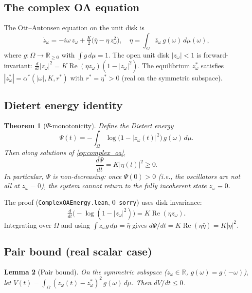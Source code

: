 \documentclass[12pt]{article}
\newtheorem{theorem}{Theorem}[section]
\newtheorem{lemma}[theorem]{Lemma}
\theoremstyle{definition}
\begin{document}
\subsection{The complex OA equation}

The Ott--Antonsen equation on the unit disk is
\begin{equation}\label{eq:complex_oa}
\dot z_\omega = -i\omega\, z_\omega + \tfrac{K}{2}\bigl(\bar\eta - \eta\, z_\omega^2\bigr),
\quad \eta = \int_\Omega \bar z_\omega\, g(\omega)\,d\mu(\omega),
\end{equation}
where $g : \Omega \to \mathbb{R}_{\ge 0}$ with $\int g\,d\mu = 1$.
The open unit disk $|z_\omega| < 1$ is forward-invariant:
$\frac{d}{dt}|z_\omega|^2 = K\operatorname{Re}(\eta z_\omega)(1 - |z_\omega|^2)$.
The equilibrium $z^*_\omega$ satisfies $|z^*_\omega| = \alpha^*(|\omega|, K, r^*)$
with $r^* = \eta^* > 0$ (real on the symmetric subspace).

\subsection{Dietert energy identity}

\begin{theorem}[$\Psi$-monotonicity]\label{thm:psi_mono}
Define the Dietert energy
\[
\Psi(t) = -\int_\Omega \log\bigl(1 - |z_\omega(t)|^2\bigr)\,g(\omega)\,d\mu.
\]
Then along solutions of \eqref{eq:complex_oa},
\begin{equation}\label{eq:psi_deriv}
\frac{d\Psi}{dt} = K|\eta(t)|^2 \ge 0.
\end{equation}
In particular, $\Psi$ is non-decreasing: once $\Psi(0) > 0$
(i.e., the oscillators are not all at $z_\omega = 0$), the system
cannot return to the fully incoherent state $z_\omega \equiv 0$.
\end{theorem}

The proof (\texttt{ComplexOAEnergy.lean}, 0~\texttt{sorry}) uses disk
invariance:
\[
\tfrac{d}{dt}\bigl(-\log(1-|z_\omega|^2)\bigr) = K\operatorname{Re}(\eta z_\omega).
\]
Integrating over $\Omega$ and using $\int z_\omega g\,d\mu = \bar\eta$
gives $d\Psi/dt = K\operatorname{Re}(\eta\bar\eta) = K|\eta|^2$.

\subsection{Pair bound (real scalar case)}

\begin{lemma}[Pair bound]\label{lem:pair_bound}
On the symmetric subspace ($z_\omega \in \mathbb{R}$, $g(\omega)=g(-\omega)$),
let $V(t) = \int_\Omega (z_\omega(t) - z^*_\omega)^2\,g(\omega)\,d\mu$.
Then $dV/dt \le 0$.
\end{lemma}
\end{document}
